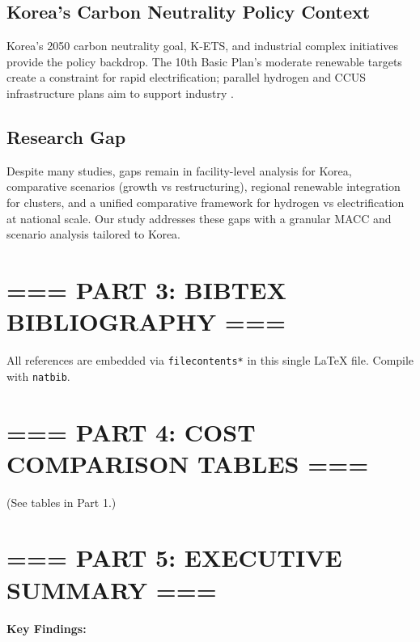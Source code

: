 \documentclass[11pt]{article}
\begin{document}
\subsection{Korea's Carbon Neutrality Policy Context}
Korea’s 2050 carbon neutrality goal, K-ETS, and industrial complex initiatives provide the policy backdrop. The 10th Basic Plan’s moderate renewable targets create a constraint for rapid electrification; parallel hydrogen and CCUS infrastructure plans aim to support industry \citep{GESI2024,InvestKorea2023}.

\subsection{Research Gap}
Despite many studies, gaps remain in facility-level analysis for Korea, comparative scenarios (growth vs restructuring), regional renewable integration for clusters, and a unified comparative framework for hydrogen vs electrification at national scale. Our study addresses these gaps with a granular MACC and scenario analysis tailored to Korea.

\section*{=== PART 3: BIBTEX BIBLIOGRAPHY ===}
All references are embedded via \texttt{filecontents*} in this single \LaTeX{} file. Compile with \texttt{natbib}.

\section*{=== PART 4: COST COMPARISON TABLES ===}
(See tables in Part 1.)

\section*{=== PART 5: EXECUTIVE SUMMARY ===}
\textbf{Key Findings:}
\end{document}
